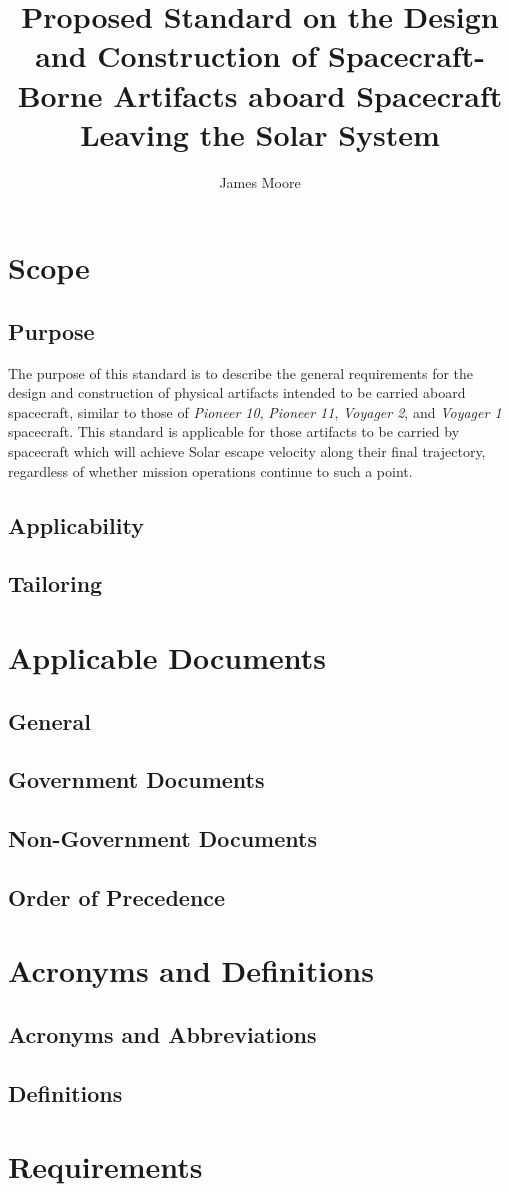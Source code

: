 \documentclass[12pt,letterpaper]{article}
\author{James Moore}
\title{Proposed Standard on the Design and Construction of Spacecraft-Borne Artifacts aboard Spacecraft Leaving the Solar System}
\begin{document}
\maketitle
\pagebreak
\tableofcontents
\pagebreak
\section{Scope}
\subsection{Purpose}
The purpose of this standard is to describe the general requirements for the design and construction of physical artifacts intended to be carried aboard spacecraft, similar to those of \textit{Pioneer 10}, \textit{Pioneer 11}, \textit{Voyager 2}, and \textit{Voyager 1} spacecraft. This standard is applicable for those artifacts to be carried by spacecraft which will achieve Solar escape velocity along their final trajectory, regardless of whether mission operations continue to such a point.

\subsection{Applicability}

\subsection{Tailoring}

\section{Applicable Documents}
\subsection{General}

\subsection{Government Documents}

\subsection{Non-Government Documents}

\subsection{Order of Precedence}

\section{Acronyms and Definitions}
\subsection{Acronyms and Abbreviations}

\subsection{Definitions}

\section{Requirements}
\end{document}
